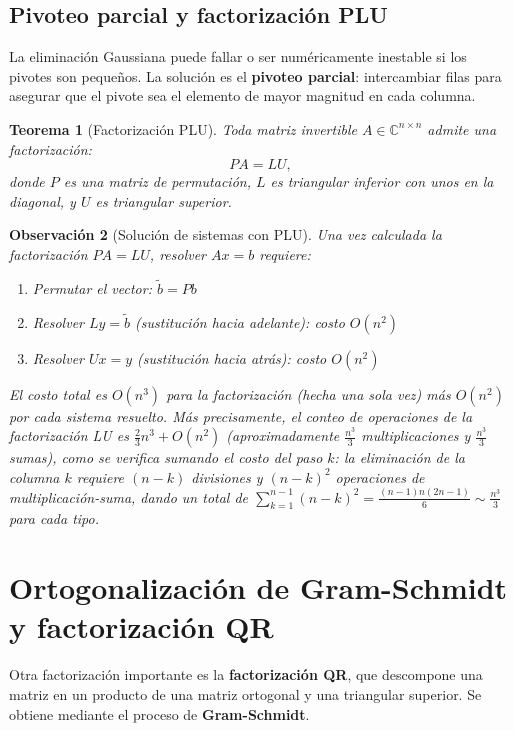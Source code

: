 \documentclass[a4paper,11pt]{report}
\newtheorem{theorem}{Teorema}[chapter]
\newtheorem{remark}[theorem]{Observación}
\begin{document}
\subsection{Pivoteo parcial y factorización PLU}

La eliminación Gaussiana puede fallar o ser numéricamente inestable si los pivotes son pequeños. La solución es el \textbf{pivoteo parcial}: intercambiar filas para asegurar que el pivote sea el elemento de mayor magnitud en cada columna.

\begin{theorem}[Factorización PLU]
Toda matriz invertible $A \in \mathbb{C}^{n \times n}$ admite una factorización:
\[
PA = LU,
\]
donde $P$ es una matriz de permutación, $L$ es triangular inferior con unos en la diagonal, y $U$ es triangular superior.
\end{theorem}

\begin{remark}[Solución de sistemas con PLU]
Una vez calculada la factorización $PA = LU$, resolver $Ax = b$ requiere:
\begin{enumerate}
\item Permutar el vector: $\tilde{b} = Pb$
\item Resolver $Ly = \tilde{b}$ (sustitución hacia adelante): costo $O(n^2)$
\item Resolver $Ux = y$ (sustitución hacia atrás): costo $O(n^2)$
\end{enumerate}
El costo total es $O(n^3)$ para la factorización (hecha una sola vez) más $O(n^2)$ por cada sistema resuelto. Más precisamente, el conteo de operaciones de la factorización LU es $\frac{2}{3}n^3 + O(n^2)$ (aproximadamente $\frac{n^3}{3}$ multiplicaciones y $\frac{n^3}{3}$ sumas), como se verifica sumando el costo del paso $k$: la eliminación de la columna $k$ requiere $(n-k)$ divisiones y $(n-k)^2$ operaciones de multiplicación-suma, dando un total de $\sum_{k=1}^{n-1}(n-k)^2 = \frac{(n-1)n(2n-1)}{6} \sim \frac{n^3}{3}$ para cada tipo.
\end{remark}

\section{Ortogonalización de Gram-Schmidt y factorización QR}

Otra factorización importante es la \textbf{factorización QR}, que descompone una matriz en un producto de una matriz ortogonal y una triangular superior. Se obtiene mediante el proceso de \textbf{Gram-Schmidt}.
\end{document}
